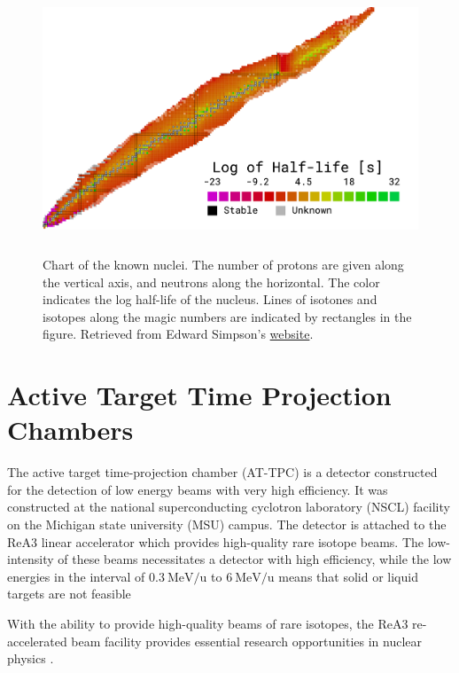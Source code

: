 \begin{figure}
\centering
\includegraphics[width=\textwidth, height=8cm]{../plots/chart}
\caption[Chart of the nuclei]{Chart of the known nuclei. The number of protons are given along the vertical axis, and neutrons along the horizontal. The color indicates the log half-life of the nucleus. Lines of isotones and isotopes along the magic numbers are indicated by rectangles in the figure. Retrieved from Edward Simpson's \href{https://people.physics.anu.edu.au/~ecs103/chart/}{website}.}
\end{figure}

\section{Active Target Time Projection Chambers}\label{sec:attpc}

The active target time-projection chamber (AT-TPC) is a detector constructed for the detection of low energy beams with very high efficiency. It was constructed at the national superconducting cyclotron laboratory (NSCL) facility on the Michigan state university (MSU) campus. The detector is attached to the ReA3 linear accelerator which provides high-quality rare isotope beams. The low-intensity of these beams necessitates a detector with high efficiency, while the low energies in the interval of $\SI[per-mode=symbol]{0.3}{\MeV \per \atomicmassunit}$ to $\SI[per-mode=symbol]{6}{\MeV \per \atomicmassunit}$ means that solid or liquid targets are not feasible \cite{Bradt2017a}

 With the ability to provide high-quality beams of rare isotopes, the ReA3 re-accelerated beam facility provides essential research opportunities in nuclear physics \cite{Kester2010}. 

